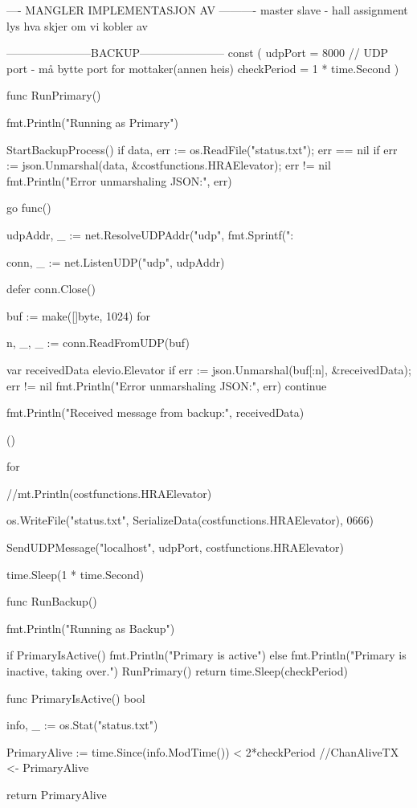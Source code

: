 ---- MANGLER IMPLEMENTASJON AV ----------
master slave - hall assignment
lys
hva skjer om vi kobler av








-----------------------BACKUP-----------------------
const (
    udpPort     = 8000 // UDP port - må bytte port for mottaker(annen heis)
    checkPeriod = 1 * time.Second
)


func RunPrimary() {
    fmt.Println("Running as Primary")
	

    StartBackupProcess()
    if data, err := os.ReadFile("status.txt"); err == nil {
        if err := json.Unmarshal(data, &costfunctions.HRAElevator); err != nil {
            fmt.Println("Error unmarshaling JSON:", err)
        }
    }

    go func() {
        udpAddr, _ := net.ResolveUDPAddr("udp", fmt.Sprintf(":%

        conn, _ := net.ListenUDP("udp", udpAddr)

        defer conn.Close()

        buf := make([]byte, 1024)
        for {
            n, _, _ := conn.ReadFromUDP(buf)

            var receivedData elevio.Elevator
            if err := json.Unmarshal(buf[:n], &receivedData); err != nil {
                fmt.Println("Error unmarshaling JSON:", err)
                continue
            }

            fmt.Println("Received message from backup:", receivedData)
        }
    }()

    for {
        //mt.Println(costfunctions.HRAElevator)

        os.WriteFile("status.txt", SerializeData(costfunctions.HRAElevator), 0666)

        SendUDPMessage("localhost", udpPort, costfunctions.HRAElevator)

        time.Sleep(1 * time.Second)
    }
}

func RunBackup() {
    fmt.Println("Running as Backup")
    
        if PrimaryIsActive() {
            fmt.Println("Primary is active")
        } else {
            fmt.Println("Primary is inactive, taking over.")
            RunPrimary()
            return
        }
        time.Sleep(checkPeriod)
}

func PrimaryIsActive() bool {
    info, _ := os.Stat("status.txt")

	PrimaryAlive := time.Since(info.ModTime()) < 2*checkPeriod
	//ChanAliveTX <- PrimaryAlive

    return PrimaryAlive
}

